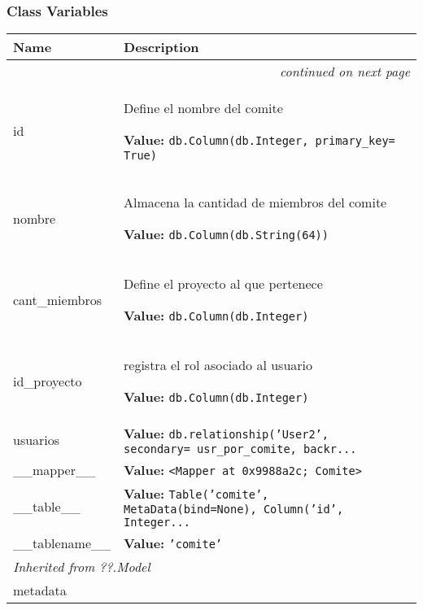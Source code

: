 
  \subsubsection{Class Variables}

    \vspace{-1cm}
\hspace{\varindent}\begin{longtable}{|p{\varnamewidth}|p{\vardescrwidth}|l}
\cline{1-2}
\cline{1-2} \centering \textbf{Name} & \centering \textbf{Description}& \\
\cline{1-2}
\endhead\cline{1-2}\multicolumn{3}{r}{\small\textit{continued on next page}}\\\endfoot\cline{1-2}
\endlastfoot\raggedright i\-d\- & \raggedright Define el nombre del comite

\textbf{Value:} 
{\tt db.Column(db.Integer, primary\_key= True)}&\\
\cline{1-2}
\raggedright n\-o\-m\-b\-r\-e\- & \raggedright Almacena la cantidad de miembros del comite

\textbf{Value:} 
{\tt db.Column(db.String(64))}&\\
\cline{1-2}
\raggedright c\-a\-n\-t\-\_\-m\-i\-e\-m\-b\-r\-o\-s\- & \raggedright Define el proyecto al que pertenece

\textbf{Value:} 
{\tt db.Column(db.Integer)}&\\
\cline{1-2}
\raggedright i\-d\-\_\-p\-r\-o\-y\-e\-c\-t\-o\- & \raggedright registra el rol asociado al usuario

\textbf{Value:} 
{\tt db.Column(db.Integer)}&\\
\cline{1-2}
\raggedright u\-s\-u\-a\-r\-i\-o\-s\- & \raggedright \textbf{Value:} 
{\tt db.relationship('User2', secondary= usr\_por\_comite, backr\texttt{...}}&\\
\cline{1-2}
\raggedright \_\-\_\-m\-a\-p\-p\-e\-r\-\_\-\_\- & \raggedright \textbf{Value:} 
{\tt {\textless}Mapper at 0x9988a2c; Comite{\textgreater}}&\\
\cline{1-2}
\raggedright \_\-\_\-t\-a\-b\-l\-e\-\_\-\_\- & \raggedright \textbf{Value:} 
{\tt Table('comite', MetaData(bind=None), Column('id', Integer\texttt{...}}&\\
\cline{1-2}
\raggedright \_\-\_\-t\-a\-b\-l\-e\-n\-a\-m\-e\-\_\-\_\- & \raggedright \textbf{Value:} 
{\tt \texttt{'}\texttt{comite}\texttt{'}}&\\
\cline{1-2}
\multicolumn{2}{|l|}{\textit{Inherited from ??.Model}}\\
\multicolumn{2}{|p{\varwidth}|}{\raggedright metadata}\\
\cline{1-2}
\end{longtable}

